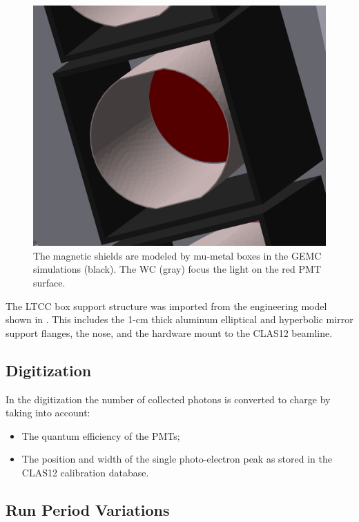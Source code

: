 \begin{figure}
	\centering
	\includegraphics[width=0.99\columnwidth,keepaspectratio]{img/simShield.png}
	\caption{The magnetic shields are modeled by mu-metal boxes in the GEMC simulations (black). The WC (gray)
          focus the light on the red PMT surface.}
	\label{fig:simShield}
\end{figure}


The LTCC box support structure was imported from the engineering model shown in . This includes the
1-cm thick aluminum elliptical and hyperbolic mirror support flanges, the nose, and the hardware mount to the CLAS12
beamline.

\subsection{Digitization}

In the digitization the number of collected photons is converted to charge by taking into account:

\begin{itemize}
	\item The quantum efficiency of the PMTs;
	\item The position and width of the single photo-electron peak as stored in the CLAS12 calibration database.
\end{itemize}

\subsection{Run Period Variations}

